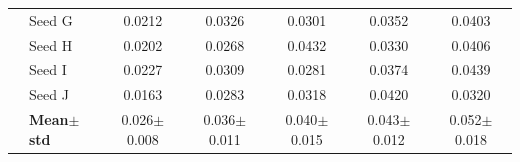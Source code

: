 \begin{table}[H]
{\begin{tabular}{@{}llccccc@{}}
  & Seed G & {\small 0.0212} & {\small 0.0326} & {\small 0.0301} & {\small 0.0352} & {\small 0.0403} \\
  & Seed H & {\small 0.0202} & {\small 0.0268} & {\small 0.0432} & {\small 0.0330} & {\small 0.0406} \\
  & Seed I & {\small 0.0227} & {\small 0.0309} & {\small 0.0281} & {\small 0.0374} & {\small 0.0439} \\
  & Seed J & {\small 0.0163} & {\small 0.0283} & {\small 0.0318} & {\small 0.0420} & {\small 0.0320} \\
 & \textbf{Mean$\pm$std} & \cellcolor{ForestGreen!25}0.026$\pm$0.008 & \cellcolor{ForestGreen!25}0.036$\pm$0.011 & \cellcolor{ForestGreen!25}0.040$\pm$0.015 & \cellcolor{ForestGreen!25}0.043$\pm$0.012 & \cellcolor{ForestGreen!25}0.052$\pm$0.018 \\
\bottomrule
\end{tabular}
}
\end{table}

